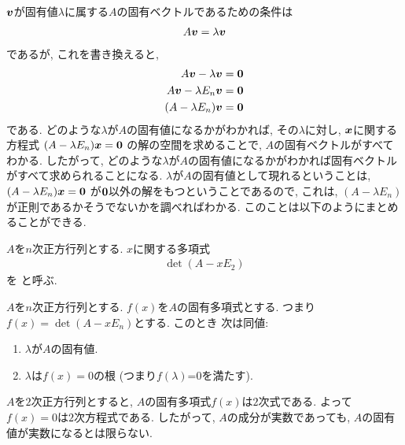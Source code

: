 $\boldsymbol{v}$が固有値$\lambda$に属する$A$の固有ベクトルであるための条件は
\begin{align*}
  A\boldsymbol{v}=\lambda\boldsymbol{v}
\end{align*}
であるが,
これを書き換えると,
\begin{align*}
  A\boldsymbol{v}-\lambda\boldsymbol{v}&=\boldsymbol{0}\\
  A\boldsymbol{v}-\lambda E_n \boldsymbol{v}&=\boldsymbol{0}\\
  (A-\lambda E_n) \boldsymbol{v}&=\boldsymbol{0}
\end{align*}
である.
どのような$\lambda$が$A$の固有値になるかがわかれば,
その$\lambda$に対し,
$\boldsymbol{x}$に関する方程式
$(A-\lambda E_n) \boldsymbol{x}=\boldsymbol{0}$
の解の空間を求めることで,
$A$の固有ベクトルがすべてわかる.
したがって,
どのような$\lambda$が$A$の固有値になるかがわかれば固有ベクトルがすべて求められることになる.
$\lambda$が$A$の固有値として現れるということは,
$(A-\lambda E_n) \boldsymbol{x}=\boldsymbol{0}$
が$\boldsymbol{0}$以外の解をもつということであるので,
これは, $(A-\lambda E_n)$が正則であるかそうでないかを調べればわかる.
このことは以下のようにまとめることができる.
\begin{definition}
  \label{def:charpoly}
  $A$を$n$次正方行列とする.
  $x$に関する多項式
  \begin{align*}
  \det(A-xE_2)
  \end{align*}
  を
  と呼ぶ.
\end{definition}
\begin{prop}
  $A$を$n$次正方行列とする.
  $f(x)$を$A$の固有多項式とする.
  つまり $f(x)=\det(A-xE_n)$とする.
  このとき 次は同値:
  \begin{enumerate}
  \item $\lambda$が$A$の固有値.
  \item $\lambda$は$f(x)=0$の根 (つまり$f(\lambda)$=0を満たす).
  \end{enumerate}
\end{prop}

\begin{remark}
  $A$を$2$次正方行列とすると, $A$の固有多項式$f(x)$は$2$次式である.
  よって$f(x)=0$は$2$次方程式である.
  したがって, $A$の成分が実数であっても,
  $A$の固有値が実数になるとは限らない.
\end{remark}

